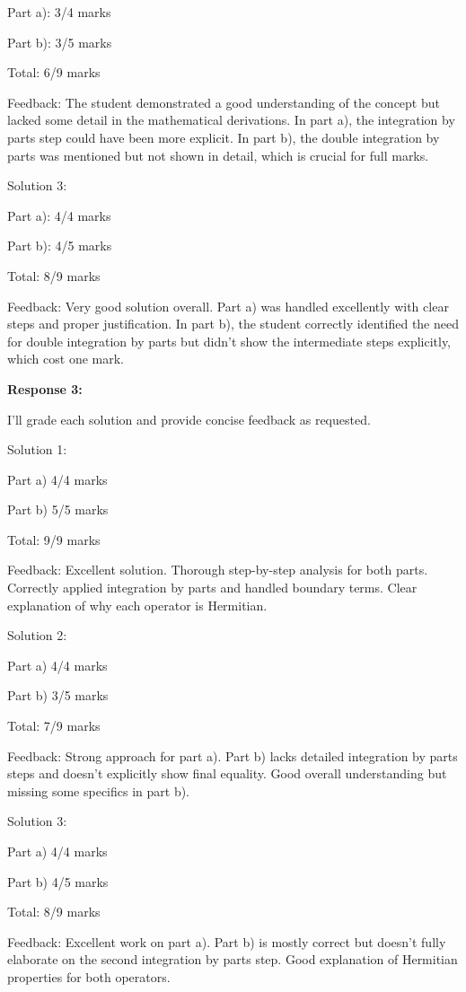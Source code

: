\documentclass[a4paper,11pt]{article}
\begin{document}
Part a): 3/4 marks

Part b): 3/5 marks

Total: 6/9 marks

Feedback: The student demonstrated a good understanding of the concept but lacked some detail in the mathematical derivations. In part a), the integration by parts step could have been more explicit. In part b), the double integration by parts was mentioned but not shown in detail, which is crucial for full marks.

Solution 3:

Part a): 4/4 marks

Part b): 4/5 marks

Total: 8/9 marks

Feedback: Very good solution overall. Part a) was handled excellently with clear steps and proper justification. In part b), the student correctly identified the need for double integration by parts but didn't show the intermediate steps explicitly, which cost one mark.

\bigskip   
\textbf{Response 3:}

I'll grade each solution and provide concise feedback as requested.

Solution 1:

Part a) 4/4 marks

Part b) 5/5 marks

Total: 9/9 marks

Feedback: Excellent solution. Thorough step-by-step analysis for both parts. Correctly applied integration by parts and handled boundary terms. Clear explanation of why each operator is Hermitian.

Solution 2:

Part a) 4/4 marks

Part b) 3/5 marks

Total: 7/9 marks

Feedback: Strong approach for part a). Part b) lacks detailed integration by parts steps and doesn't explicitly show final equality. Good overall understanding but missing some specifics in part b).

Solution 3:

Part a) 4/4 marks

Part b) 4/5 marks

Total: 8/9 marks

Feedback: Excellent work on part a). Part b) is mostly correct but doesn't fully elaborate on the second integration by parts step. Good explanation of Hermitian properties for both operators.
\end{document}
